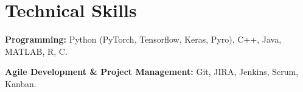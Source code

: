 \documentclass[letterpaper]{article}
\renewenvironment{itemize}{
  \begin{list}{}{
    \setlength{\leftmargin}{1.5em}
  }
}{
  \end{list}
}
\begin{document}
\section*{Technical Skills}
\begin{itemize}
    \item \textbf{Programming:} Python (PyTorch, Tensorflow, Keras, Pyro), C++, Java, MATLAB, R, C.
    \item \textbf{Agile Development \& Project Management:} Git, JIRA, Jenkins, Scrum, Kanban.
\end{itemize}

\iffalse 
\section*{Reviewer Activity}
\begin{itemize}
    \item The Web Conference (WWW) 2018, IEEE TETCI 2017, CSL 2017
\end{itemize}


\section*{Extracurricular Activities}
\begin{itemize}
    \item Music: bass guitar, guitar, clarinet, ukulele, guitalele.
    \item Sports: windsurfing, tennis, squash, running, hiking.
    \item Dance: salsa (in progress), cretan folk.
    \item Photography: dslr, mobile.
\end{itemize}

\section*{Languages}
\begin{itemize}
    \item English (fluent), French (intermediate), Greek (native), Spanish (beginner).
\end{itemize}
\fi
\end{document}
